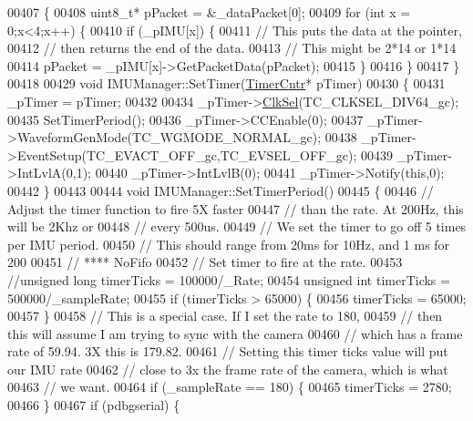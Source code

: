 \begin{DoxyCode}
{00407 \{
00408     uint8\_t*    pPacket = &\_dataPacket[0];
00409     \textcolor{keywordflow}{for} (\textcolor{keywordtype}{int} x = 0;x<4;x++) \{
00410         \textcolor{keywordflow}{if} (\_pIMU[x]) \{
00411             \textcolor{comment}{// This puts the data at the pointer,}
00412             \textcolor{comment}{// then returns the end of the data.}
00413             \textcolor{comment}{// This might be 2*14 or 1*14}
00414             pPacket = \_pIMU[x]->GetPacketData(pPacket);
00415         \}
00416     \}
00417 \}
00418 
00429 \textcolor{keywordtype}{void} IMUManager::SetTimer(\hyperlink{class_timer_cntr}{TimerCntr}* pTimer)
00430 \{
00431     \_pTimer = pTimer;
00432     
00434     \_pTimer->\hyperlink{class_timer_cntr_a6e5c896a3f85311e011ee552534f1032}{ClkSel}(TC\_CLKSEL\_DIV64\_gc);
00435     SetTimerPeriod();
00436     \_pTimer->CCEnable(0);
00437     \_pTimer->WaveformGenMode(TC\_WGMODE\_NORMAL\_gc);
00438     \_pTimer->EventSetup(TC\_EVACT\_OFF\_gc,TC\_EVSEL\_OFF\_gc);
00439     \_pTimer->IntLvlA(0,1);
00440     \_pTimer->IntLvlB(0);
00441     \_pTimer->Notify(\textcolor{keyword}{this},0);
00442 \}
00443 
00444 \textcolor{keywordtype}{void} IMUManager::SetTimerPeriod()
00445 \{
00446     \textcolor{comment}{// Adjust the timer function to fire 5X faster}
00447     \textcolor{comment}{// than the rate. At 200Hz, this will be 2Khz or }
00448     \textcolor{comment}{// every 500us. }
00449     \textcolor{comment}{// We set the timer to go off 5 times per IMU period.}
00450     \textcolor{comment}{// This should range from 20ms for 10Hz, and 1 ms for 200}
00451     \textcolor{comment}{// **** NoFifo}
00452     \textcolor{comment}{// Set timer to fire at the rate.}
00453     \textcolor{comment}{//unsigned long timerTicks = 100000/\_Rate;}
00454     \textcolor{keywordtype}{unsigned} \textcolor{keywordtype}{int} timerTicks = 500000/\_sampleRate;
00455     \textcolor{keywordflow}{if} (timerTicks > 65000) \{
00456         timerTicks = 65000;
00457     \}
00458     \textcolor{comment}{// This is a special case. If I set the rate to 180,}
00459     \textcolor{comment}{// then this will assume I am trying to sync with the camera}
00460     \textcolor{comment}{// which has a frame rate of 59.94. 3X this is 179.82.}
00461     \textcolor{comment}{// Setting this timer ticks value will put our IMU rate}
00462     \textcolor{comment}{// close to 3x the frame rate of the camera, which is what}
00463     \textcolor{comment}{// we want.}
00464     \textcolor{keywordflow}{if} (\_sampleRate == 180) \{
00465         timerTicks = 2780;
00466     \}
00467     \textcolor{keywordflow}{if} (pdbgserial) \{
}
\end{DoxyCode}
